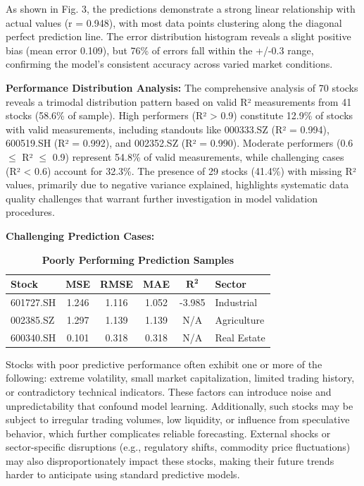 \documentclass[3p,times,procedia]{elsarticle}
\begin{document}
As shown in Fig. 3, the predictions demonstrate a strong linear relationship with actual values (r = 0.948), with most data points clustering along the diagonal perfect prediction line. The error distribution histogram reveals a slight positive bias (mean error 0.109), but 76\% of errors fall within the +/-0.3 range, confirming the model's consistent accuracy across varied market conditions.

\textbf{Performance Distribution Analysis:} The comprehensive analysis of 70 stocks reveals a trimodal distribution pattern based on valid R² measurements from 41 stocks (58.6\% of sample). High performers (R² > 0.9) constitute 12.9\% of stocks with valid measurements, including standouts like 000333.SZ (R² = 0.994), 600519.SH (R² = 0.992), and 002352.SZ (R² = 0.990). Moderate performers (0.6 $\leq$ R² $\leq$ 0.9) represent 54.8\% of valid measurements, while challenging cases (R² < 0.6) account for 32.3\%. The presence of 29 stocks (41.4\%) with missing R² values, primarily due to negative variance explained, highlights systematic data quality challenges that warrant further investigation in model validation procedures.

\vspace{0.3cm}

\textbf{Challenging Prediction Cases:}

\begin{table}[!ht]
\renewcommand{\arraystretch}{1.5} %
\centering
\large %
\caption{\textbf{Poorly Performing Prediction Samples}}
\begin{tabular}{|l|c|c|c|c|l|}
\hline
\textbf{Stock} & \textbf{MSE} & \textbf{RMSE} & \textbf{MAE} & \textbf{$\mathbf{R^2}$} & \textbf{Sector} \\
\hline
601727.SH & 1.246 & 1.116 & 1.052 & -3.985 & Industrial \\
002385.SZ & 1.297 & 1.139 & 1.139 & N/A    & Agriculture \\
600340.SH & 0.101 & 0.318 & 0.318 & N/A    & Real Estate \\
\hline
\end{tabular}
\end{table}

Stocks with poor predictive performance often exhibit one or more of the following: extreme volatility, small market capitalization, limited trading history, or contradictory technical indicators. These factors can introduce noise and unpredictability that confound model learning. Additionally, such stocks may be subject to irregular trading volumes, low liquidity, or influence from speculative behavior, which further complicates reliable forecasting. External shocks or sector-specific disruptions (e.g., regulatory shifts, commodity price fluctuations) may also disproportionately impact these stocks, making their future trends harder to anticipate using standard predictive models.
\end{document}
